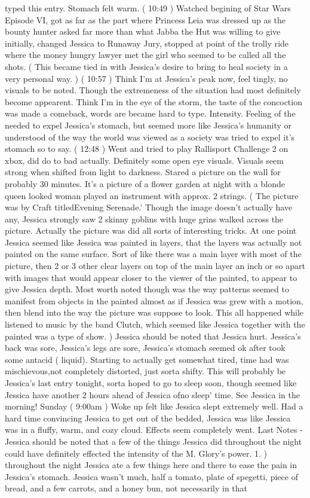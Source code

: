 \documentclass[12pt]{book}
\begin{document}
typed this entry. Stomach felt warm. ( 10:49 ) Watched begining of Star Wars Episode VI, got as far as the part where Princess Leia was dressed up as the bounty hunter asked far more than what Jabba the Hut was willing to give initially, changed Jessica to Runaway Jury, stopped at point of the trolly ride where the money hungry lawyer met the girl who seemed to be called all the shots. ( This became tied in with Jessica's desire to bring to heal society in a very personal way. ) ( 10:57 ) Think I'm at Jessica's peak now, feel tingly, no visuals to be noted. Though the extremeness of the situation had most definitely become appearent. Think I'm in the eye of the storm, the taste of the concoction was made a comeback, words are became hard to type. Intensity. Feeling of the needed to expel Jessica's stomach, but seemed more like Jessica's humanity or understood of the way the world was viewed as a society was tried to expel it's stomach so to say. ( 12:48 ) Went and tried to play Rallisport Challenge 2 on xbox, did do to bad actually. Definitely some open eye visuals. Visuals seem strong when shifted from light to darkness. Stared a picture on the wall for probably 30 minutes. It's a picture of a flower garden at night with a blonde queen looked woman played an instrument with approx. 2 strings. ( The picture was by Craft titledEvening Serenade.' Though the image doesn't actually have any, Jessica strongly saw 2 skinny goblins with huge grins walked across the picture. Actually the picture was did all sorts of interesting tricks. At one point Jessica seemed like Jessica was painted in layers, that the layers was actually not painted on the same surface. Sort of like there was a main layer with most of the picture, then 2 or 3 other clear layers on top of the main layer an inch or so apart with images that would appear closer to the viewer of the painted, to appear to give Jessica depth. Most worth noted though was the way patterns seemed to manifest from objects in the painted almost as if Jessica was grew with a motion, then blend into the way the picture was suppose to look. This all happened while listened to music by the band Clutch, which seemed like Jessica together with the painted was a type of show. ) Jessica should be noted that Jessica hurt. Jessica's back was sore, Jessica's legs are sore, Jessica's stomach seemed ok after took some antacid ( liquid). Starting to actually get somewhat tired, time had was mischievous,not completely distorted, just sorta shifty. This will probably be Jessica's last entry tonight, sorta hoped to go to sleep soon, though seemed like Jessica have another 2 hours ahead of Jessica ofno sleep' time. See Jessica in the morning! Sunday ( 9:00am ) Woke up felt like Jessica slept extremely well. Had a hard time convincing Jessica to get out of the bedded, Jessica was like Jessica was in a fluffy, warm, and cozy cloud. Effects seem completely went. Last Notes - Jessica should be noted that a few of the things Jessica did throughout the night could have definitely effected the intensity of the M. Glory's power. 1. ) throughout the night Jessica ate a few things here and there to ease the pain in Jessica's stomach. Jessica wasn't much, half a tomato, plate of spegetti, piece of bread, and a few carrots, and a honey bun, not necessarily in that 
\end{document}
